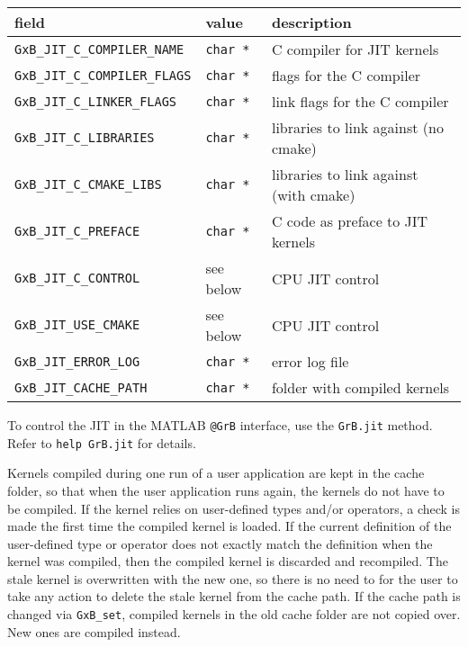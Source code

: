\documentclass[12pt]{article}
\begin{document}
\vspace{0.15in}
{\footnotesize
\begin{tabular}{lll}
\hline
field                       & value         & description \\
\hline
\verb'GxB_JIT_C_COMPILER_NAME' & \verb'char *' & C compiler for JIT kernels \\
\verb'GxB_JIT_C_COMPILER_FLAGS'& \verb'char *' & flags for the C compiler \\
\verb'GxB_JIT_C_LINKER_FLAGS' & \verb'char *' & link flags for the C compiler \\
\verb'GxB_JIT_C_LIBRARIES'    & \verb'char *' & libraries to link against (no cmake) \\
\verb'GxB_JIT_C_CMAKE_LIBS'   & \verb'char *' & libraries to link against (with cmake) \\
\verb'GxB_JIT_C_PREFACE'      & \verb'char *' & C code as preface to JIT kernels \\
\verb'GxB_JIT_C_CONTROL'      & see below     & CPU JIT control \\
\verb'GxB_JIT_USE_CMAKE'      & see below     & CPU JIT control \\
\verb'GxB_JIT_ERROR_LOG'      & \verb'char *' & error log file \\
\verb'GxB_JIT_CACHE_PATH'     & \verb'char *' & folder with compiled kernels \\
\hline
\end{tabular}
}
\vspace{0.15in}

To control the JIT in the MATLAB \verb'@GrB' interface, use the \verb'GrB.jit'
method.  Refer to \verb'help GrB.jit' for details. 

Kernels compiled during one run of a user application are kept in the cache
folder, so that when the user application runs again, the kernels do not have
to be compiled.  If the kernel relies on user-defined types and/or operators, a
check is made the first time the compiled kernel is loaded.  If the current
definition of the user-defined type or operator does not exactly match the
definition when the kernel was compiled, then the compiled kernel is discarded
and recompiled.  The stale kernel is overwritten with the new one, so there is
no need to for the user to take any action to delete the stale kernel from the
cache path.  If the cache path is changed via \verb'GxB_set', compiled kernels
in the old cache folder are not copied over.  New ones are compiled instead.

\end{document}
